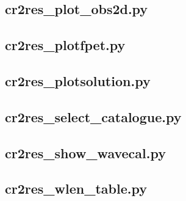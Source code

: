 \subsection{cr2res\_plot\_obs2d.py}
\subsection{cr2res\_plotfpet.py}
\subsection{cr2res\_plotsolution.py}
\subsection{cr2res\_select\_catalogue.py}
\subsection{cr2res\_show\_wavecal.py}
\subsection{cr2res\_wlen\_table.py}
